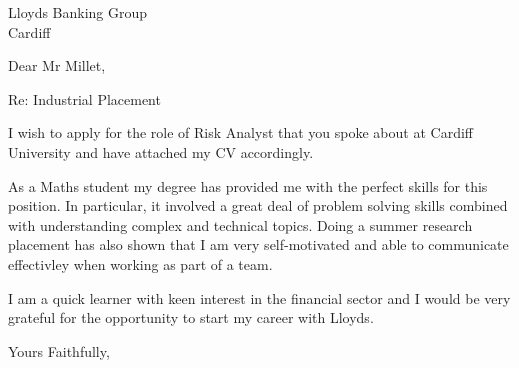 \documentclass[12pt]{letter}
\begin{document}
\begin{letter}
{Lloyds Banking Group \\ Cardiff}
\opening{Dear Mr Millet,}

Re: Industrial Placement

I wish to apply for the role of Risk Analyst that you spoke about at Cardiff University and have attached my CV accordingly.

As a Maths student my degree has provided me with the perfect skills for this position.
In particular, it involved a great deal of problem solving skills combined with understanding complex and technical topics.
Doing a summer research placement has also shown that I am very self-motivated and able to communicate effectivley when working as part of a team.

I am a quick learner with keen interest in the financial sector and I would be very grateful for the opportunity to start my career with Lloyds.

\closing{Yours Faithfully,}


\end{letter}
\end{document}
